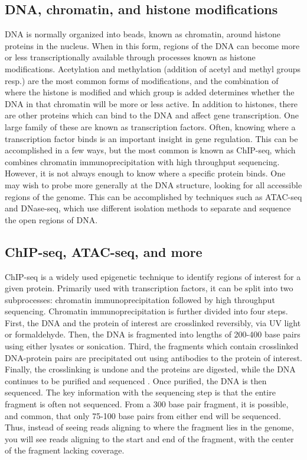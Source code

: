 \documentclass[a4paper]{article}
\begin{document}
    \subsection{DNA, chromatin, and histone modifications}
    DNA is normally organized into beads, known as chromatin, around histone proteins in the nucleus. When in this form,
    regions of the DNA can become more or less transcriptionally available through processes known as histone modifications.
    Acetylation and methylation (addition of acetyl and methyl groups resp.) are the most common forms of modifications, and
    the combination of where the histone is modified and which group is added determines whether the DNA in that chromatin
    will be more or less active. In addition to histones, there are other proteins which can bind to the DNA and affect
    gene transcription. One large family of these are known as transcription factors. Often, knowing where a transcription
    factor binds is an important insight in gene regulation. This can be accomplished in a few ways, but the most common
    is known as ChIP-seq, which combines chromatin immunoprecipitation with high throughput sequencing.
    However, it is not always enough to know where a specific protein binds. One may wish to probe
    more generally at the DNA structure, looking for all accessible regions of the genome. This can be accomplished by
    techniques such as ATAC-seq and DNase-seq, which use different isolation methods to separate and sequence the open regions of DNA.

    \subsection{ChIP-seq, ATAC-seq, and more}
    ChIP-seq \cite{johnson_genome-wide_2007} is a widely used epigenetic technique to identify regions of interest for a given protein. Primarily used
    with transcription factors, it can be split into two subprocesses: chromatin immunoprecipitation followed by high
    throughput sequencing. Chromatin immunoprecipitation is further divided into four steps. First, the DNA and the protein
    of interest are crosslinked reversibly, via UV light or formaldehyde. Then, the DNA is fragmented into lengths of 200-400
    base pairs using either lysates or sonication. Third, the fragments which contain crosslinked DNA-protein pairs are
    precipitated out using antibodies to the protein of interest. Finally, the crosslinking is undone and the proteins
    are digested, while the DNA continues to be purified and sequenced \cite{collas_current_2010}. Once purified, the DNA is then sequenced.
    The key information with the sequencing step is that the entire fragment is often not sequenced. From a 300 base pair
    fragment, it is possible, and common, that only 75-100 base pairs from either end will be sequenced. Thus, instead
    of seeing reads aligning to where the fragment lies in the genome, you will see reads aligning to the start and end
    of the fragment, with the center of the fragment lacking coverage.
\end{document}
